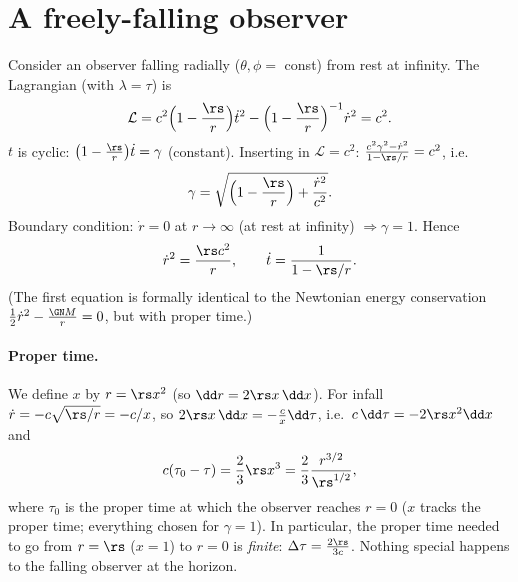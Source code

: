 \section{A freely-falling observer}

Consider an observer falling radially ($\theta,\phi=$ const) from rest at infinity. The Lagrangian (with $\lambda=\tau$) is
\[
  \mathcal L=c^2\Big(1-\frac\rs r\Big)\dot t^2-\Big(1-\frac\rs r\Big)^{-1}\dot r^2=c^2 .
\]
$t$ is cyclic: $\big(1-\frac\rs r\big)\dot t=\gamma$ (constant). Inserting in $\mathcal L=c^2$: $\frac{c^2\gamma^2-\dot r^2}{1-\rs/r}=c^2$, i.e.
\[
  \gamma=\sqrt{\Big(1-\frac{\rs}{r}\Big)+\frac{\dot r^2}{c^2}} .
\]
Boundary condition: $\dot r=0$ at $r\to\infty$ (at rest at infinity) $\Rightarrow\gamma=1$. Hence
\begin{equation}
  \dot r^2=\frac{\rs c^2}{r},\qquad\dot t=\frac{1}{1-\rs/r}.
\end{equation}
(The first equation is formally identical to the Newtonian energy conservation $\frac12\dot r^2-\frac{\GN M}{r}=0$, but with proper time.)

\paragraph{Proper time.} We define $x$ by $r=\rs x^2$ (so $\dd r=2\rs x\,\dd x$). For infall $\dot r=-c\sqrt{\rs/r}=-c/x$, so $2\rs x\,\dd x=-\frac cx\dd\tau$, i.e.\ $c\,\dd\tau=-2\rs x^2\dd x$ and
\begin{equation}
  c(\tau_0-\tau)=\frac23\rs x^3=\frac23\frac{r^{3/2}}{\rs^{1/2}},
\end{equation}
where $\tau_0$ is the proper time at which the observer reaches $r=0$ ($x$ tracks the proper time; everything chosen for $\gamma=1$). In particular, the proper time needed to go from $r=\rs$ ($x=1$) to $r=0$ is \emph{finite}: $\Delta\tau=\frac{2\rs}{3c}$. Nothing special happens to the falling observer at the horizon.

